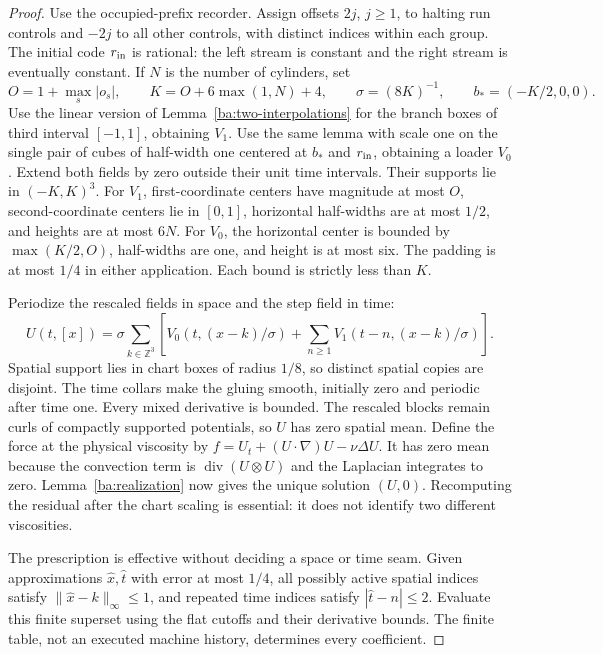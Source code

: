 \begin{proof}\label{ba:occupied-torus-proof}
Use the occupied-prefix recorder.  Assign offsets $2j$, $j\ge1$, to
halting run controls and $-2j$ to all other controls, with distinct
indices within each group.  The initial code $r_{\rm in}$ is rational:
the left stream is constant and the right stream is eventually constant.
If $N$ is the number of cylinders, set
\[
 O=1+\max_s|o_s|,\qquad K=O+6\max(1,N)+4,\qquad
 \sigma=(8K)^{-1},\qquad b_*=(-K/2,0,0).
\]
Use the linear version of Lemma~\ref{ba:two-interpolations} for the
branch boxes of third interval $[-1,1]$, obtaining $V_1$.
Use the same lemma with scale one on the single pair of cubes of
half-width one centered at $b_*$ and $r_{\rm in}$, obtaining a loader
$V_0$.  Extend both fields by zero outside their unit time intervals.
Their supports lie in $(-K,K)^3$.  For $V_1$, first-coordinate centers
have magnitude at most $O$, second-coordinate centers lie in $[0,1]$,
horizontal half-widths are at most $1/2$, and heights are at most $6N$.
For $V_0$, the horizontal center is bounded by $\max(K/2,O)$,
half-widths are one, and height is at most six.  The padding is at most
$1/4$ in either application.  Each bound is strictly less than $K$.

Periodize the rescaled fields in space and the step field in time:
\[
 U(t,[x])=\sigma\sum_{k\in\mathbb Z^3}
 \left[V_0(t,(x-k)/\sigma)+
       \sum_{n\ge1}V_1(t-n,(x-k)/\sigma)\right].
\]
Spatial support lies in chart boxes of radius $1/8$, so distinct spatial
copies are disjoint.  The time collars make the gluing smooth, initially
zero and periodic after time one.  Every mixed derivative is bounded.
The rescaled blocks remain curls of compactly supported potentials,
so $U$ has zero spatial mean.  Define the force at the physical viscosity
by $f=U_t+(U\cdot\nabla)U-\nu\Delta U$.  It has zero mean because
the convection term is $\operatorname{div}(U\otimes U)$ and the
Laplacian integrates to zero.  Lemma~\ref{ba:realization} now gives
the unique solution $(U,0)$.  Recomputing the residual after the chart
scaling is essential: it does not identify two different viscosities.

The prescription is effective without deciding a space or time seam.
Given approximations $\widehat x,\widehat t$ with error at most $1/4$,
all possibly active spatial indices satisfy
$\|\widehat x-k\|_\infty\le1$, and repeated time indices satisfy
$|\widehat t-n|\le2$.  Evaluate this finite superset using the flat
cutoffs and their derivative bounds.  The finite table, not an executed
machine history, determines every coefficient.


\end{proof}
